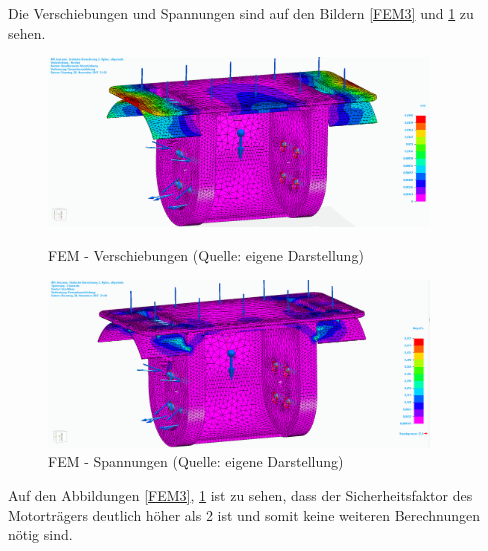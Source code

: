 Die Verschiebungen und Spannungen sind auf den Bildern \ref{FEM3} und \ref{FEM4} zu sehen. 

\begin{figure}[htb]
	\centering
	\begin{minipage}{0.49\linewidth}
		\centering\includegraphics[width=0.9\textwidth]{images/FEM3.png}
		\caption{FEM - Verschiebungen \newline (Quelle: eigene Darstellung)}
		\label{FEM3}
	\end{minipage}
	\begin{minipage}[h]{0.49\linewidth}
		\centering\includegraphics[width=0.9\textwidth]{images/FEM4.png}
		\caption{FEM - Spannungen \newline (Quelle: eigene Darstellung)}
		\label{FEM4}
	\end{minipage}
\end{figure}

Auf den Abbildungen \ref{FEM3}, \ref{FEM4} ist zu sehen, dass der Sicherheitsfaktor des Motorträgers deutlich höher als 2 ist und somit keine weiteren Berechnungen nötig sind.

